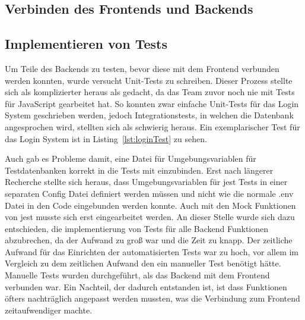 \subsection{Verbinden des Frontends und Backends}\label{subsec:verbinden-des-frontends-und-backends}

\subsection{Implementieren von Tests}\label{subsec:implementieren-von-tests}

Um Teile des Backends zu testen, bevor diese mit dem Frontend verbunden werden konnten, wurde versucht Unit-Tests zu schreiben.
Dieser Prozess stellte sich als komplizierter heraus als gedacht, da das Team zuvor noch nie mit Tests für JavaScript gearbeitet hat.
So konnten zwar einfache Unit-Tests für das Login System geschrieben werden, jedoch Integrationstests, in welchen die Datenbank angesprochen wird, stellten sich als schwierig heraus.
Ein exemplarischer Test für das Login System ist in Listing~\ref{lst:loginTest} zu sehen.





Auch gab es Probleme damit, eine Datei für Umgebungsvariablen für Testdatenbanken korrekt in die Tests mit einzubinden.
Erst nach längerer Recherche stellte sich heraus, dass Umgebungsvariablen für jest Tests in einer separaten Config Datei definiert werden müssen und nicht wie die normale .env Datei in den Code eingebunden werden konnte.
Auch mit den Mock Funktionen von jest musste sich erst eingearbeitet werden.
An dieser Stelle wurde sich dazu entschieden, die implementierung von Tests für alle Backend Funktionen abzubrechen, da der Aufwand zu groß war und die Zeit zu knapp.
Der zeitliche Aufwand für das Einrichten der automatisierten Tests war zu hoch, vor allem im Vergleich zu dem zeitlichen Aufwand den ein manueller Test benötigt hätte.
Manuelle Tests wurden durchgeführt, als das Backend mit dem Frontend verbunden war.
Ein Nachteil, der dadurch entstanden ist, ist dass Funktionen öfters nachträglich angepasst werden mussten, was die Verbindung zum Frontend zeitaufwendiger machte.